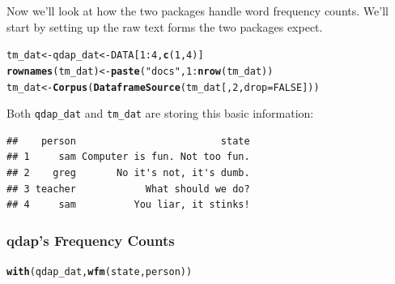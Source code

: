 \documentclass{article}\usepackage[]{graphicx}\usepackage[]{color}
\makeatletter
\newcommand{\hlnum}[1]{\textcolor[rgb]{0.686,0.059,0.569}{#1}}%
\newcommand{\hlstr}[1]{\textcolor[rgb]{0.192,0.494,0.8}{#1}}%
\newcommand{\hlopt}[1]{\textcolor[rgb]{0,0,0}{#1}}%
\newcommand{\hlstd}[1]{\textcolor[rgb]{0.345,0.345,0.345}{#1}}%
\newcommand{\hlkwb}[1]{\textcolor[rgb]{0.69,0.353,0.396}{#1}}%
\newcommand{\hlkwc}[1]{\textcolor[rgb]{0.333,0.667,0.333}{#1}}%
\newcommand{\hlkwd}[1]{\textcolor[rgb]{0.737,0.353,0.396}{\textbf{#1}}}%
\newenvironment{kframe}{%
 \def\at@end@of@kframe{}%
 \ifinner\ifhmode%
  \def\at@end@of@kframe{\end{minipage}}%
  \begin{minipage}{\columnwidth}%
 \fi\fi%
 \def\FrameCommand##1{\hskip\@totalleftmargin \hskip-\fboxsep
 \colorbox{shadecolor}{##1}\hskip-\fboxsep
     \hskip-\linewidth \hskip-\@totalleftmargin \hskip\columnwidth}%
 \MakeFramed {\advance\hsize-\width
   \@totalleftmargin\z@ \linewidth\hsize
   \@setminipage}}%
 {\par\unskip\endMakeFramed%
 \at@end@of@kframe}
\newenvironment{knitrout}{}{} %
\makeatother
\begin{document}
\hspace{.4cm} Now we'll look at how the two packages handle word frequency counts.  We'll start by setting up the raw text forms the two packages expect.

\begin{knitrout}
\color{fgcolor}\begin{kframe}
\begin{alltt}
\hlstd{tm_dat} \hlkwb{<-} \hlstd{qdap_dat} \hlkwb{<-} \hlstd{DATA[}\hlnum{1}\hlopt{:}\hlnum{4}\hlstd{,} \hlkwd{c}\hlstd{(}\hlnum{1}\hlstd{,} \hlnum{4}\hlstd{)]}
\hlkwd{rownames}\hlstd{(tm_dat)} \hlkwb{<-} \hlkwd{paste}\hlstd{(}\hlstr{"docs"}\hlstd{,} \hlnum{1}\hlopt{:}\hlkwd{nrow}\hlstd{(tm_dat))}
\hlstd{tm_dat} \hlkwb{<-} \hlkwd{Corpus}\hlstd{(}\hlkwd{DataframeSource}\hlstd{(tm_dat[,} \hlnum{2}\hlstd{,} \hlkwc{drop}\hlstd{=}\hlnum{FALSE}\hlstd{]))}
\end{alltt}
\end{kframe}
\end{knitrout}

 
\noindent Both \texttt{qdap\_dat} and \texttt{tm\_dat} are storing this basic information:

\begin{knitrout}
\color{fgcolor}\begin{kframe}
\begin{verbatim}
##    person                         state
## 1     sam Computer is fun. Not too fun.
## 2    greg       No it's not, it's dumb.
## 3 teacher            What should we do?
## 4     sam          You liar, it stinks!
\end{verbatim}
\end{kframe}
\end{knitrout}


\subsubsection{qdap's Frequency Counts}

\begin{knitrout}
\color{fgcolor}\begin{kframe}
\begin{alltt}
\hlkwd{with}\hlstd{(qdap_dat,} \hlkwd{wfm}\hlstd{(state, person))}
\end{alltt}
\end{kframe}
\end{knitrout}
\end{document}
